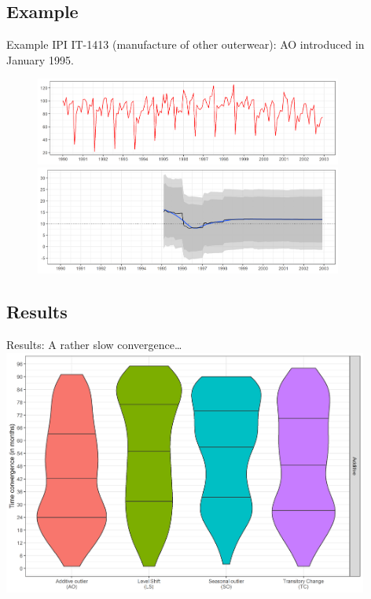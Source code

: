 \documentclass[10pt, handout]{beamer}
\begin{document}
\subsection{Example}
\begin{frame}{Example}
\footnotesize
IPI IT-1413 (manufacture of other outerwear): AO introduced in January 1995. 
\normalsize
\begin{figure}
\centering
\includegraphics[width=0.9\textwidth]{img/AO_ipi_it1413_y.png}

\includegraphics[width=0.9\textwidth]{img/AO_ipi_it1413_est.png}
\end{figure}
\end{frame}


\subsection{Results}
\begin{frame}{Results: A rather slow convergence\ldots{}}
\centering
\includegraphics[width=0.9\textwidth]{img/outliers_convergence_additif_5.png}\\
\end{frame}
\end{document}
